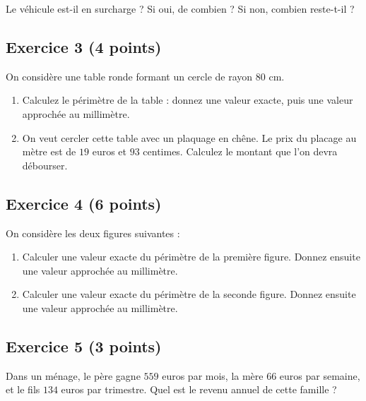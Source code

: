 \documentclass[14pt]{extreport}
\theoremstyle{plain}
\begin{document}
Le véhicule est-il en surcharge ?
Si oui, de combien ? Si non, combien reste-t-il ?

\subsection*{Exercice 3 (4 points)}  %

On considère une table ronde formant un cercle de rayon $80$ cm. 
\begin{enumerate}
\item Calculez le périmètre de la table : donnez une valeur exacte, puis une valeur approchée au millimètre.
\item On veut cercler cette table avec un plaquage en chêne. Le prix du placage au mètre est de $19$ euros et $93$ centimes. Calculez le montant que l'on devra débourser.
\end{enumerate}




\subsection*{Exercice 4 (6 points)}
On considère les deux figures suivantes : 

\begin{figure}[H]
\center 
{}
\end{figure} 
\begin{enumerate}
\item Calculer une valeur exacte du périmètre de la première figure. Donnez ensuite une valeur approchée au millimètre. 

\item Calculer une valeur exacte du périmètre de la seconde figure. Donnez ensuite une valeur approchée au millimètre. 
\end{enumerate} 


\subsection*{Exercice 5 (3 points)}

Dans un ménage, le père gagne $559$ euros par mois, la mère $66$ euros par semaine, et le fils $134$ euros par trimestre. Quel est le revenu annuel de cette famille ?
\end{document}
